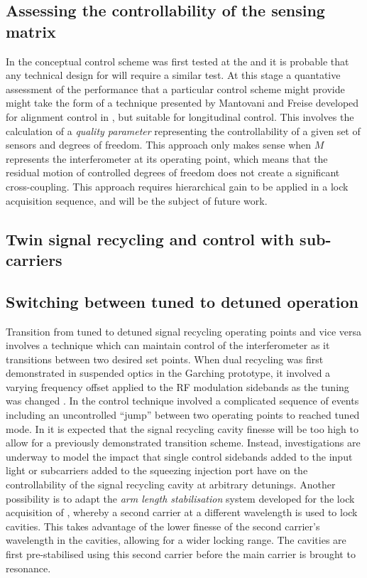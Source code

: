 \subsection{Assessing the controllability of the sensing matrix}
In \ALIGO{} the conceptual control scheme was first tested at the \CALTECHFORTYM{} and it is probable that any technical design for \ETLF{} will require a similar test. At this stage a quantative assessment of the performance that a particular control scheme might provide might take the form of a technique presented by Mantovani and Freise \cite{Mantovani2008} developed for alignment control in \VIRGO{}, but suitable for longitudinal control. This involves the calculation of a \emph{quality parameter} representing the controllability of a given set of sensors and degrees of freedom. This approach only makes sense when $M$ represents the interferometer at its operating point, which means that the residual motion of controlled degrees of freedom does not create a significant cross-coupling. This approach requires hierarchical gain to be applied in a lock acquisition sequence, and will be the subject of future work.

\subsection{Twin signal recycling and control with sub-carriers}

\subsection{Switching between tuned to detuned operation}
Transition from tuned to detuned signal recycling operating points and vice versa involves a technique which can maintain control of the interferometer as it transitions between two desired set points. When dual recycling was first demonstrated in suspended optics in the Garching prototype, it involved a varying frequency offset applied to the \gls{RF} modulation sidebands as the tuning was changed \cite{Freise2000}. In \GEO{} the control technique involved a complicated sequence of events \cite{Grote2004} including an uncontrolled ``jump'' between two operating points \cite{Hild2007} to reached tuned mode. In \ETLF{} it is expected that the signal recycling cavity finesse will be too high to allow for a previously demonstrated transition scheme. Instead, investigations are underway to model the impact that single control sidebands added to the input light or subcarriers added to the squeezing injection port have on the controllability of the signal recycling cavity at arbitrary detunings. Another possibility is to adapt the \emph{arm length stabilisation} system developed for the lock acquisition of \ALIGO{} \cite{Mullavey2012, Staley2014}, whereby a second carrier at a different wavelength is used to lock cavities. This takes advantage of the lower finesse of the second carrier's wavelength in the cavities, allowing for a wider locking range. The cavities are first pre-stabilised using this second carrier before the main carrier is brought to resonance.


